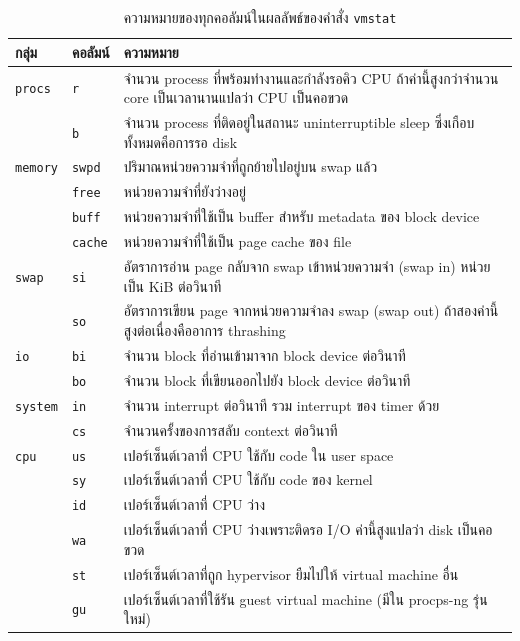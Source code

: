 \documentclass[a4paper,11pt]{article}
\newcommand{\code}[1]{\texttt{#1}}
\begin{document}
\begin{table}[H]
\centering\small
\caption{ความหมายของทุกคอลัมน์ในผลลัพธ์ของคำสั่ง \code{vmstat}}
\begin{tabular}{@{}p{1.5cm}p{2.0cm}p{12.1cm}@{}}
\toprule
\textbf{กลุ่ม} & \textbf{คอลัมน์} & \textbf{ความหมาย} \\
\midrule
\code{procs} & \code{r} & จำนวน process ที่พร้อมทำงานและกำลังรอคิว CPU ถ้าค่านี้สูงกว่าจำนวน core เป็นเวลานานแปลว่า CPU เป็นคอขวด \\
 & \code{b} & จำนวน process ที่ติดอยู่ในสถานะ uninterruptible sleep ซึ่งเกือบทั้งหมดคือการรอ disk \\
\midrule
\code{memory} & \code{swpd} & ปริมาณหน่วยความจำที่ถูกย้ายไปอยู่บน swap แล้ว \\
 & \code{free} & หน่วยความจำที่ยังว่างอยู่ \\
 & \code{buff} & หน่วยความจำที่ใช้เป็น buffer สำหรับ metadata ของ block device \\
 & \code{cache} & หน่วยความจำที่ใช้เป็น page cache ของ file \\
\midrule
\code{swap} & \code{si} & อัตราการอ่าน page กลับจาก swap เข้าหน่วยความจำ (swap in) หน่วยเป็น KiB ต่อวินาที \\
 & \code{so} & อัตราการเขียน page จากหน่วยความจำลง swap (swap out) ถ้าสองค่านี้สูงต่อเนื่องคืออาการ thrashing \\
\midrule
\code{io} & \code{bi} & จำนวน block ที่อ่านเข้ามาจาก block device ต่อวินาที \\
 & \code{bo} & จำนวน block ที่เขียนออกไปยัง block device ต่อวินาที \\
\midrule
\code{system} & \code{in} & จำนวน interrupt ต่อวินาที รวม interrupt ของ timer ด้วย \\
 & \code{cs} & จำนวนครั้งของการสลับ context ต่อวินาที \\
\midrule
\code{cpu} & \code{us} & เปอร์เซ็นต์เวลาที่ CPU ใช้กับ code ใน user space \\
 & \code{sy} & เปอร์เซ็นต์เวลาที่ CPU ใช้กับ code ของ kernel \\
 & \code{id} & เปอร์เซ็นต์เวลาที่ CPU ว่าง \\
 & \code{wa} & เปอร์เซ็นต์เวลาที่ CPU ว่างเพราะติดรอ I/O ค่านี้สูงแปลว่า disk เป็นคอขวด \\
 & \code{st} & เปอร์เซ็นต์เวลาที่ถูก hypervisor ยืมไปให้ virtual machine อื่น \\
 & \code{gu} & เปอร์เซ็นต์เวลาที่ใช้รัน guest virtual machine (มีใน procps-ng รุ่นใหม่) \\
\bottomrule
\end{tabular}
\end{table}
\end{document}
